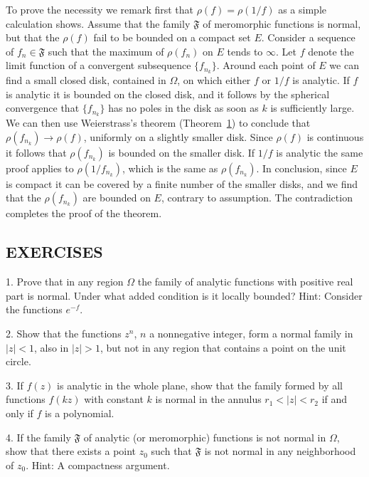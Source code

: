 To prove the necessity we remark first that $\rho(f) = \rho(1/f)$ as a simple calculation shows. Assume that the family $\mathfrak{F}$ of meromorphic functions is normal, but that the $\rho(f)$ fail to be bounded on a compact set $E$. Consider a sequence of $f_n \in \mathfrak{F}$ such that the maximum of $\rho(f_n)$ on $E$ tends to $\infty$. Let $f$ denote the limit function of a convergent subsequence $\{f_{n_k}\}$. Around each point of $E$ we can find a small closed disk, contained in $\Omega$, on which either $f$ or $1/f$ is analytic. If $f$ is analytic it is bounded on the closed disk, and it follows by the spherical convergence that $\{f_{n_k}\}$ has no poles in the disk as soon as $k$ is sufficiently large. We can then use Weierstrass's theorem (Theorem~\hyperref[thm:5.1]{1}) to conclude that $\rho(f_{n_k}) \to \rho(f)$, uniformly on a slightly smaller disk. Since $\rho(f)$ is continuous it follows that $\rho(f_{n_k})$ is bounded on the smaller disk. If $1/f$ is analytic the same proof applies to $\rho(1/f_{n_k})$, which is the same as $\rho(f_{n_k})$. In conclusion, since $E$ is compact it can be covered by a finite number of the smaller disks, and we find that the $\rho(f_{n_k})$ are bounded on $E$, contrary to assumption. The contradiction completes the proof of the theorem.

\subsection*{EXERCISES}
1. Prove that in any region $\Omega$ the family of analytic functions with positive real part is normal. Under what added condition is it locally bounded? Hint: Consider the functions $e^{-f}$.

2. Show that the functions $z^{n}$, $n$ a nonnegative integer, form a normal family in $|z| < 1$, also in $|z| > 1$, but not in any region that contains a point on the unit circle.

3. If $f(z)$ is analytic in the whole plane, show that the family formed by all functions $f(kz)$ with constant $k$ is normal in the annulus $r_{1} < |z| < r_{2}$ if and only if $f$ is a polynomial.

4. If the family $\mathfrak{F}$ of analytic (or meromorphic) functions is not normal in $\Omega$, show that there exists a point $z_0$ such that $\mathfrak{F}$ is not normal in any neighborhood of $z_0$. Hint: A compactness argument.


